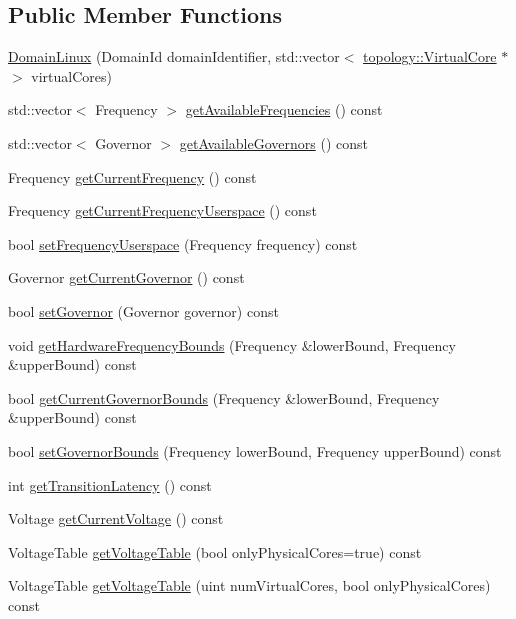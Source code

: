 \subsection*{Public Member Functions}
\begin{DoxyCompactItemize}
\item 
\hyperlink{classmammut_1_1cpufreq_1_1DomainLinux_a0479968ba0436f75ade42d2c63ca34aa}{Domain\-Linux} (Domain\-Id domain\-Identifier, std\-::vector$<$ \hyperlink{classmammut_1_1topology_1_1VirtualCore}{topology\-::\-Virtual\-Core} $\ast$ $>$ virtual\-Cores)
\item 
std\-::vector$<$ Frequency $>$ \hyperlink{classmammut_1_1cpufreq_1_1DomainLinux_a842b3b21fb5fc87c65368dc48cbc02af}{get\-Available\-Frequencies} () const 
\item 
std\-::vector$<$ Governor $>$ \hyperlink{classmammut_1_1cpufreq_1_1DomainLinux_a2596e269900a9567a02cf10b14407bb4}{get\-Available\-Governors} () const 
\item 
Frequency \hyperlink{classmammut_1_1cpufreq_1_1DomainLinux_a31cda10038615a5d98fdf38a67a4682a}{get\-Current\-Frequency} () const 
\item 
Frequency \hyperlink{classmammut_1_1cpufreq_1_1DomainLinux_a22d59973df8f67d8bec1d50e9391cda6}{get\-Current\-Frequency\-Userspace} () const 
\item 
bool \hyperlink{classmammut_1_1cpufreq_1_1DomainLinux_a792ff8e660b86a59703ac0bf9271c53d}{set\-Frequency\-Userspace} (Frequency frequency) const 
\item 
Governor \hyperlink{classmammut_1_1cpufreq_1_1DomainLinux_ab8873a08cc11c89a6119ad87402d130d}{get\-Current\-Governor} () const 
\item 
bool \hyperlink{classmammut_1_1cpufreq_1_1DomainLinux_a3437283a0a9117fb37f68035cc2b6470}{set\-Governor} (Governor governor) const 
\item 
void \hyperlink{classmammut_1_1cpufreq_1_1DomainLinux_a3c92f649d3de3327fdaff788ca7dc8bc}{get\-Hardware\-Frequency\-Bounds} (Frequency \&lower\-Bound, Frequency \&upper\-Bound) const 
\item 
bool \hyperlink{classmammut_1_1cpufreq_1_1DomainLinux_ae84e936d5175b72112ed70a99971d6ae}{get\-Current\-Governor\-Bounds} (Frequency \&lower\-Bound, Frequency \&upper\-Bound) const 
\item 
bool \hyperlink{classmammut_1_1cpufreq_1_1DomainLinux_ab4d990a6ec4d83e23286c0efe28a0c50}{set\-Governor\-Bounds} (Frequency lower\-Bound, Frequency upper\-Bound) const 
\item 
int \hyperlink{classmammut_1_1cpufreq_1_1DomainLinux_a7758f61e7f43ac8ffa63945e44218f4a}{get\-Transition\-Latency} () const 
\item 
Voltage \hyperlink{classmammut_1_1cpufreq_1_1DomainLinux_a32ed27f14678d73b904b7810e0cef19c}{get\-Current\-Voltage} () const 
\item 
Voltage\-Table \hyperlink{classmammut_1_1cpufreq_1_1DomainLinux_abe2cc1707083e66686e32f82a06a4b8b}{get\-Voltage\-Table} (bool only\-Physical\-Cores=true) const 
\item 
Voltage\-Table \hyperlink{classmammut_1_1cpufreq_1_1DomainLinux_a851ab4324c9612340a0d33e670a0aa14}{get\-Voltage\-Table} (uint num\-Virtual\-Cores, bool only\-Physical\-Cores) const 
\end{DoxyCompactItemize}
